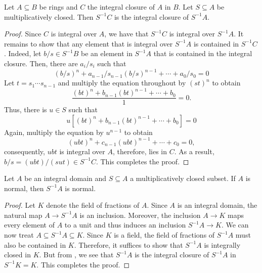 \begin{lemma}
    Let $A\subseteq B$ be rings and $C$ the integral closure of $A$ in $B$. Let $S\subseteq A$ be multiplicatively closed. Then $S^{-1}C$ is the integral closure of $S^{-1}A$.
\end{lemma}
\begin{proof}
    Since $C$ is integral over $A$, we have that $S^{-1}C$ is integral over $S^{-1}A$. It remains to show that any element that is integral over $S^{-1}A$ is contained in $S^{-1}C$. Indeed, let $b/s\in S^{-1}B$ be an element in $S^{-1}A$ that is contained in the integral closure. Then, there are $a_i/s_i$ such that 
    \begin{equation*}
        (b/s)^n + a_{n - 1}/s_{n - 1}(b/s)^{n - 1} + \cdots + a_0/s_0 = 0
    \end{equation*}
    Let $t = s_1\cdots s_{n - 1}$ and multiply the equation throughout by $(st)^n$ to obtain 
    \begin{equation*}
        \frac{(bt)^n + b_{n - 1}(bt)^{n - 1} + \cdots + b_0}{1} = 0.
    \end{equation*}
    Thus, there is $u\in S$ such that 
    \begin{equation*}
        u\left[(bt)^n + b_{n - 1}(bt)^{n - 1} + \cdots + b_0\right] = 0
    \end{equation*}
    Again, multiply the equation by $u^{n - 1}$ to obtain 
    \begin{equation*}
        (ubt)^n + c_{n - 1}(ubt)^{n - 1} + \cdots + c_0 = 0,
    \end{equation*}
    consequently, $ubt$ is integral over $A$, therefore, lies in $C$. As a result, $b/s = (ubt)/(sut)\in S^{-1}C$. This completes the proof.
\end{proof}

\begin{lemma}
    Let $A$ be an integral domain and $S\subseteq A$ a multiplicatively closed subset. If $A$ is normal, then $S^{-1}A$ is normal.
\end{lemma}
\begin{proof}
    Let $K$ denote the field of fractions of $A$. Since $A$ is an integral domain, the natural map $A\to S^{-1}A$ is an inclusion. Moreover, the inclusion $A\to K$ maps every element of $A$ to a unit and thus induces an inclusion $S^{-1}A\to K$. We can now treat $A\subseteq S^{-1}A\subseteq K$. Since $K$ is a field, the field of fractions of $S^{-1}A$ must also be contained in $K$. Therefore, it suffices to show that $S^{-1}A$ is integrally closed in $K$. But from , we see that $S^{-1}A$ is the integral closure of $S^{-1}A$ in $S^{-1}K = K$. This completes the proof.
\end{proof}

